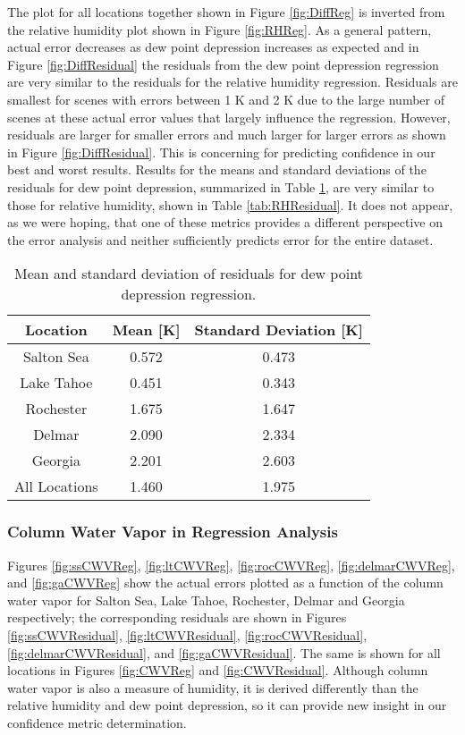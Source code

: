 \documentclass{book}
\begin{document}
The plot for all locations together shown in Figure \ref{fig:DiffReg} is inverted from the relative humidity plot shown in Figure \ref{fig:RHReg}.  As a general pattern, actual error decreases as dew point depression increases as expected and in Figure \ref{fig:DiffResidual} the residuals from the dew point depression regression are very similar to the residuals for the relative humidity regression.  Residuals are smallest for scenes with errors between 1 K and 2 K due to the large number of scenes at these actual error values that largely influence the regression.  However, residuals are larger for smaller errors and much larger for larger errors as shown in Figure \ref{fig:DiffResidual}.  This is concerning for predicting confidence in our best and worst results.  Results for the means and standard deviations of the residuals for dew point depression, summarized in Table \ref{tab:DiffResidual}, are very similar to those for relative humidity, shown in Table \ref{tab:RHResidual}.  It does not appear, as we were hoping, that one of these metrics provides a different perspective on the error analysis and neither sufficiently predicts error for the entire dataset.

\begin{table}[H]
\begin{center}
\begin{tabular}{| c | c | c |}
\hline
Location & Mean [K] & Standard Deviation [K] \\ \hline
Salton Sea & 0.572 & 0.473 \\ \hline
Lake Tahoe & 0.451 & 0.343 \\ \hline
Rochester & 1.675 & 1.647 \\ \hline
Delmar & 2.090 & 2.334 \\ \hline
Georgia & 2.201 & 2.603 \\ \hline
All Locations & 1.460 & 1.975 \\ \hline
\end{tabular}
\caption{Mean and standard deviation of residuals for dew point depression regression.}
\label{tab:DiffResidual}
\end{center}
\end{table}

\subsubsection{Column Water Vapor in Regression Analysis}

Figures \ref{fig:ssCWVReg}, \ref{fig:ltCWVReg}, \ref{fig:rocCWVReg}, \ref{fig:delmarCWVReg}, and \ref{fig:gaCWVReg} show the actual errors plotted as a function of the column water vapor for Salton Sea, Lake Tahoe, Rochester, Delmar and Georgia respectively; the corresponding residuals are shown in Figures \ref{fig:ssCWVResidual}, \ref{fig:ltCWVResidual}, \ref{fig:rocCWVResidual}, \ref{fig:delmarCWVResidual}, and \ref{fig:gaCWVResidual}.  The same is shown for all locations in Figures \ref{fig:CWVReg} and \ref{fig:CWVResidual}.  Although column water vapor is also a measure of humidity, it is derived differently than the relative humidity and dew point depression, so it can provide new insight in our confidence metric determination.
\end{document}
